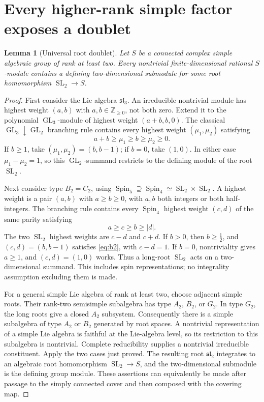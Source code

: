 \documentclass[11pt]{article}
\numberwithin{equation}{section}
\newtheorem{lemma}[theorem]{Lemma}
\theoremstyle{definition}
\theoremstyle{remark}
\newcommand{\Z}{\mathbb Z}
\DeclareMathOperator{\SL}{SL}
\DeclareMathOperator{\GL}{GL}
\DeclareMathOperator{\Spin}{Spin}
\newcommand{\sltwo}{\mathfrak{sl}_2}
\newcommand{\slthree}{\mathfrak{sl}_3}
\begin{document}
\section{Every higher-rank simple factor exposes a doublet}\label{sec:doublets}
\begin{lemma}[Universal root doublet]\label{lem:doublet}
Let $S$ be a connected complex simple algebraic group of rank at least two. Every nontrivial finite-dimensional rational $S$-module contains a defining two-dimensional submodule for some root homomorphism $\SL_2\to S$.
\end{lemma}
\begin{proof}
First consider the Lie algebra $\slthree$. An irreducible nontrivial module has highest weight $(a,b)$ with $a,b\in\Z_{\geq0}$, not both zero. Extend it to the polynomial $\GL_3$-module of highest weight $(a+b,b,0)$. The classical $\GL_3\downarrow\GL_2$ branching rule \cite[Theorem~2.1]{Molev} contains every highest weight $(\mu_1,\mu_2)$ satisfying
\[
 a+b\geq\mu_1\geq b\geq\mu_2\geq0.
\]
If $b\geq1$, take $(\mu_1,\mu_2)=(b,b-1)$; if $b=0$, take $(1,0)$. In either case $\mu_1-\mu_2=1$, so this $\GL_2$-summand restricts to the defining module of the root $\SL_2$.

Next consider type $B_2=C_2$, using $\Spin_5\supseteq\Spin_4\simeq\SL_2\times\SL_2$. A highest weight is a pair $(a,b)$ with $a\geq b\geq0$, with $a,b$ both integers or both half-integers. The branching rule \cite[Section~4.1, equation~(4.4)]{Molev} contains every $\Spin_4$ highest weight $(c,d)$ of the same parity satisfying
\begin{equation}\label{eq:b2}
 a\geq c\geq b\geq|d|.
\end{equation}
The two $\SL_2$ highest weights are $c-d$ and $c+d$. If $b>0$, then $b\geq\tfrac12$, and $(c,d)=(b,b-1)$ satisfies \eqref{eq:b2}, with $c-d=1$. If $b=0$, nontriviality gives $a\geq1$, and $(c,d)=(1,0)$ works. Thus a long-root $\SL_2$ acts on a two-dimensional summand. This includes spin representations; no integrality assumption excluding them is made.

For a general simple Lie algebra of rank at least two, choose adjacent simple roots. Their rank-two semisimple subalgebra has type $A_2$, $B_2$, or $G_2$. In type $G_2$, the long roots give a closed $A_2$ subsystem. Consequently there is a simple subalgebra of type $A_2$ or $B_2$ generated by root spaces. A nontrivial representation of a simple Lie algebra is faithful at the Lie-algebra level, so its restriction to this subalgebra is nontrivial. Complete reducibility supplies a nontrivial irreducible constituent. Apply the two cases just proved. The resulting root $\sltwo$ integrates to an algebraic root homomorphism $\SL_2\to S$, and the two-dimensional submodule is the defining group module. These assertions can equivalently be made after passage to the simply connected cover and then composed with the covering map.
\end{proof}
\end{document}
